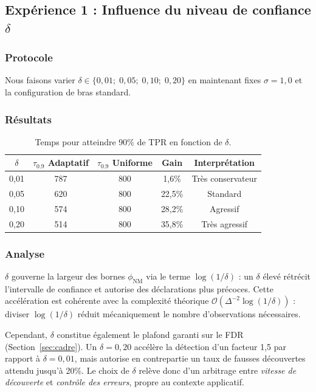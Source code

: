 \documentclass[11pt,a4paper]{article}
\newcommand{\phinm}{\phi_{\mathrm{NM}}}
\begin{document}
\subsection{Expérience 1 : Influence du niveau de confiance $\delta$}

\subsubsection{Protocole}

Nous faisons varier $\delta \in \{0{,}01;\; 0{,}05;\; 0{,}10;\; 0{,}20\}$
en maintenant fixes $\sigma = 1{,}0$ et la configuration de bras standard.

\subsubsection{Résultats}

\begin{table}[H]
\centering
\begin{tabular}{ccccc}
\hline
$\delta$ & $\tau_{0.9}$ Adaptatif & $\tau_{0.9}$ Uniforme
         & Gain & Interprétation \\
\hline
0,01 & 787 & 800 &  1,6\% & Très conservateur \\
0,05 & 620 & 800 & 22,5\% & Standard \\
0,10 & 574 & 800 & 28,2\% & Agressif \\
0,20 & 514 & 800 & 35,8\% & Très agressif \\
\hline
\end{tabular}
\caption{Temps pour atteindre 90\% de TPR en fonction de $\delta$.}
\label{tab:delta}
\end{table}

\subsubsection{Analyse}

$\delta$ gouverne la largeur des bornes $\phinm$ via le terme
$\log(1/\delta)$ : un $\delta$
élevé rétrécit l'intervalle de confiance et autorise des déclarations
plus précoces. Cette accélération est cohérente avec la complexité
théorique $\mathcal{O}(\Delta^{-2}\log(1/\delta))$ : diviser
$\log(1/\delta)$ réduit mécaniquement le nombre d'observations
nécessaires.

Cependant, $\delta$ constitue également le plafond garanti sur le FDR
(Section~\ref{sec:cadre}). Un $\delta = 0{,}20$ accélère la détection
d'un facteur 1,5 par rapport à $\delta = 0{,}01$, mais autorise en
contrepartie un taux de fausses découvertes attendu jusqu'à 20\%. Le
choix de $\delta$ relève donc d'un arbitrage entre \emph{vitesse de
découverte} et \emph{contrôle des erreurs}, propre au contexte
applicatif.
\end{document}
